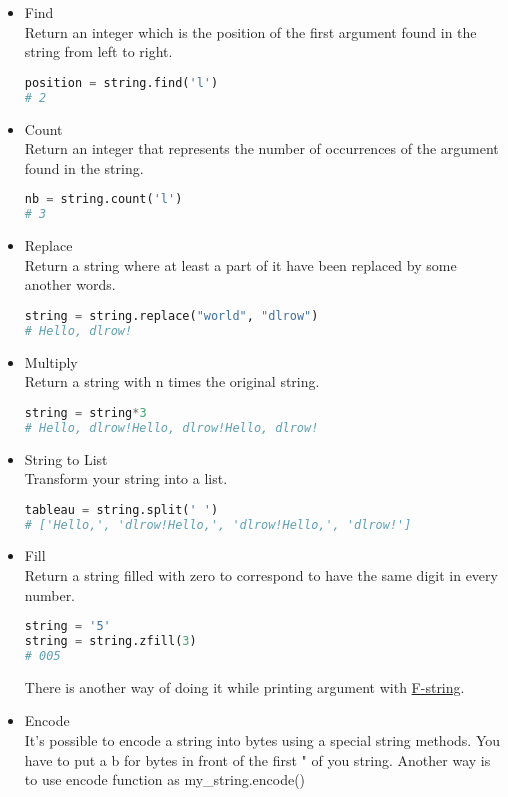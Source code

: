 \documentclass[a4paper, 12pt, titlepage]{scrartcl} %
\begin{document}
\begin{itemize}
\item Find \\
Return an integer which is the position of the first argument found in the string from left to right.
\begin{lstlisting}[language=Python]
position = string.find('l')
# 2
\end{lstlisting} \vspace{5mm}

\item Count \\
Return an integer that represents the number of occurrences of the argument found in the string. 
\begin{lstlisting}[language=Python]
nb = string.count('l')
# 3
\end{lstlisting} \vspace{5mm}

\item Replace \\
Return a string where at least a part of it have been replaced by some another words.
\begin{lstlisting}[language=Python]
string = string.replace("world", "dlrow")
# Hello, dlrow!
\end{lstlisting} \vspace{5mm}

\item Multiply \\
Return a string with n times the original string.
\begin{lstlisting}[language=Python]
string = string*3
# Hello, dlrow!Hello, dlrow!Hello, dlrow!
\end{lstlisting} \vspace{5mm}

\item String to List \\
Transform your string into a list.
\begin{lstlisting}[language=Python]
tableau = string.split(' ')
# ['Hello,', 'dlrow!Hello,', 'dlrow!Hello,', 'dlrow!']
\end{lstlisting} \vspace{5mm}

\item Fill \\
Return a string filled with zero to correspond to have the same digit in every number.
\begin{lstlisting}[language=Python]
string = '5'
string = string.zfill(3)
# 005
\end{lstlisting} \vspace{5mm}

There is another way of doing it while printing argument with \hyperref[subsec:F-string]{F-string}.

\item Encode \\
It's possible to encode a string into bytes using a special string methods. You have to put a b for bytes in front of the first " of you string. Another way is to use encode function as my\_string.encode()
\end{itemize}
\end{document}
